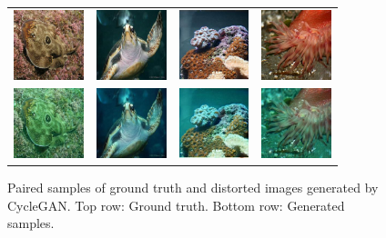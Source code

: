 \documentclass[conference]{IEEEtran}
\begin{document}
\begin{figure}
\centering
\begin{tabular}{p{1.7cm} p{1.7cm} p{1.7cm} p{1.7cm}}
   
   \includegraphics[width=0.8in]{n01496331_175_B} &
   \includegraphics[width=0.8in]{n01664065_4022_B} &
   \includegraphics[width=0.8in]{n01917289_889_B} &
   \includegraphics[width=0.8in]{n01914609_116_B} \\
   \includegraphics[width=0.8in]{n01496331_175_A} &
   \includegraphics[width=0.8in]{n01664065_4022_A} &
   \includegraphics[width=0.8in]{n01917289_889_A} &
   \includegraphics[width=0.8in]{n01914609_116_A} \\

\end{tabular}
\caption{Paired samples of ground truth and distorted images generated by CycleGAN. Top row: Ground truth.
Bottom row: Generated samples.}
\end{figure}
\end{document}

